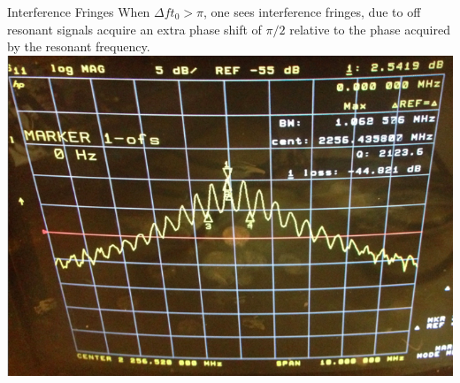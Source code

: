 \documentclass{beamer}
\begin{document}
\begin{frame}{Interference Fringes}
When $\Delta f t_0 > \pi$, one sees interference fringes, due to off resonant signals acquire an extra phase shift of $\pi/2$ relative to the phase acquired by the resonant frequency.
\includegraphics[width=\textwidth]{s21_delay}
\end{frame}
\end{document}
